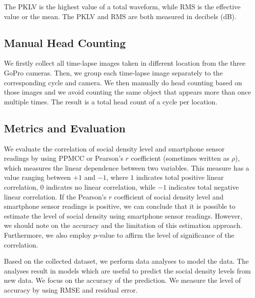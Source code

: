 The \ac{PKLV} is the highest value of a total waveform, while \ac{RMS} is the effective value or the mean. The \ac{PKLV} and \ac{RMS} are both measured in decibels (dB).

\subsection{Manual Head Counting} %
\label{sub:manual_head_counting}
We firstly collect all time-lapse images taken in different location from the three GoPro cameras. Then, we group each time-lapse image separately to the corresponding cycle and camera. We then manually do head counting based on those images and we avoid counting the same object that appears more than once multiple times. The result is a total head count of a cycle per location.
	
\subsection{Metrics and Evaluation} %
\label{sub:metrics-evaluation}
We evaluate the correlation of social density level and smartphone sensor readings by using \ac{PPMCC} or Pearson's $r$ coefficient (sometimes written as $\rho$), which measures the linear dependence between two variables. This measure has a value ranging between $+1$ and $-1$, where $1$ indicates total positive linear correlation, 0 indicates no linear correlation, while $-1$ indicates total negative linear correlation. If the Pearson's $r$ coefficient of social density level and smartphone sensor readings is positive, we can conclude that it is possible to estimate the level of social density using smartphone sensor readings. However, we should note on the accuracy and the limitation of this estimation approach. Furthermore, we also employ $p$-value to affirm the level of significance of the correlation.

Based on the collected dataset, we perform data analyses to model the data. The analyses result in models which are useful to predict the social density levels from new data. We focus on the accuracy of the prediction. We measure the level of accuracy by using \ac{RMSE} and residual error.






